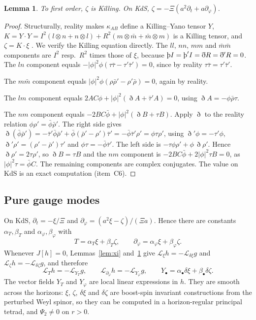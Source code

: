 \documentclass[11pt]{amsart}
\newtheorem{lemma}[theorem]{Lemma}
\theoremstyle{definition}
\theoremstyle{remark}
\numberwithin{equation}{section}
\newcommand{\Th}{\text{\th}}
\newcommand{\cL}{\mathcal{L}}
\begin{document}
\begin{lemma}\label{lem:zeta}
To first order, $\zeta$ is Killing. On KdS, $\zeta=-\Xi(a^2\partial_t+a\partial_\varphi)$.
\end{lemma}
\begin{proof}
Structurally, reality makes $\kappa_{AB}$ define a Killing--Yano tensor $Y$, $K=Y\cdot Y=I^2(l\otimes n+n\otimes l)+R^2(m\otimes\bar m+\bar m\otimes m)$
is a Killing tensor, and $\zeta=K\cdot\xi$ \cite{HS73,AA13}. We verify the Killing equation directly. The $ll$, $nn$, $mm$ and
$\bar m\bar m$ components are $I^2$ resp.\ $R^2$ times those of $\xi$, because $\Th I=\Th'I=\eth R=\eth'R=0$.
The $ln$ component equals $-|\phi|^2\phi(\tau\bar\tau-\tau'\bar\tau')=0$, since by reality
$\tau\bar\tau=\tau'\bar\tau'$.

The $m\bar m$ component equals $|\phi|^2\phi(\rho\bar\rho'-\rho'\bar\rho)=0$, again by reality.

The $lm$ component equals $2AC\phi+|\phi|^2(\eth A+\bar\tau'A)=0$, using $\eth A=-\phi\bar\rho\tau$.

The $nm$ component equals $-2BC\bar\phi+|\phi|^2(\eth B+\tau B)$. Apply $\eth$ to the reality relation
$\phi\rho'=\bar\phi\bar\rho'$. The right side gives $\eth(\bar\phi\bar\rho')=-\bar\tau'\bar\phi\bar\rho'+\bar\phi(\bar\rho'-\rho')\bar\tau'=-\bar\phi\bar\tau'\rho'=\phi\tau\rho'$,
using $\eth'\phi=-\tau'\phi$, $\eth'\rho'=(\rho'-\bar\rho')\tau'$ and $\phi\tau=-\bar\phi\bar\tau'$. The left side is
$-\tau\phi\rho'+\phi\,\eth\rho'$. Hence $\eth\rho'=2\tau\rho'$, so $\eth B=\tau B$ and the $nm$ component is
$-2BC\bar\phi+2|\phi|^2\tau B=0$, as $|\phi|^2\tau=\bar\phi C$.
The remaining components are complex conjugates. The value on KdS is an exact computation (item~C6).
\end{proof}

\subsection{Pure gauge modes}
On KdS, $\partial_t=-\xi/\Xi$ and $\partial_\varphi=(a^2\xi-\zeta)/(\Xi a)$. Hence there are constants $\alpha_T,\beta_T$
and $\alpha_\varphi,\beta_\varphi$ with
\[
T=\alpha_T\xi+\beta_T\zeta,\qquad \partial_\varphi=\alpha_\varphi\xi+\beta_\varphi\zeta.
\]
Whenever $J[h]=0$, Lemmas~\ref{lem:xi} and~\ref{lem:zeta} give $\cL_\xi h=-\cL_{\delta\xi}g$ and
$\cL_\zeta h=-\cL_{\delta\zeta}g$, and therefore
\begin{equation}\label{eq:LTh}
\cL_Th=-\cL_{Y_T}g,\qquad \cL_{\partial_\varphi}h=-\cL_{Y_\varphi}g,\qquad
Y_\bullet=\alpha_\bullet\delta\xi+\beta_\bullet\delta\zeta.
\end{equation}
The vector fields $Y_T$ and $Y_\varphi$ are local linear expressions in $h$. They are smooth across the horizons:
$\xi$, $\zeta$, $\delta\xi$ and $\delta\zeta$ are boost-spin invariant constructions from the perturbed Weyl spinor,
so they can be computed in a horizon-regular principal tetrad, and $\Psi_2\ne0$ on $r>0$.
\end{document}
